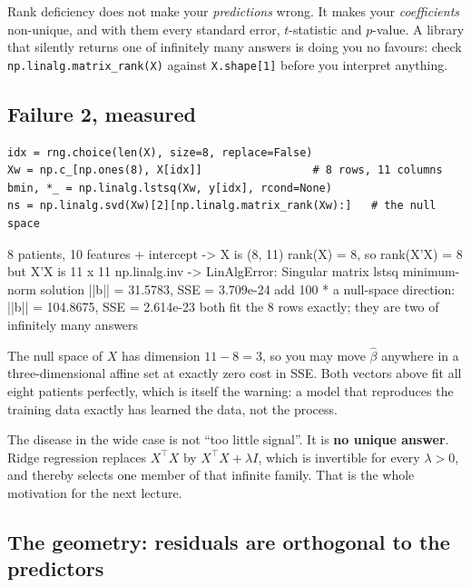 \documentclass[11pt]{article}
\newcommand{\Xt}{X^{\!\top}}
\begin{document}
\begin{caution}
Rank deficiency does not make your \emph{predictions} wrong. It makes your
\emph{coefficients} non-unique, and with them every standard error,
$t$-statistic and $p$-value. A library that silently returns one of infinitely
many answers is doing you no favours: check
\texttt{np.linalg.matrix\_rank(X)} against \texttt{X.shape[1]} before you
interpret anything.
\end{caution}

\subsection{Failure 2, measured}
\label{sec:fail2}

\begin{lstlisting}
idx = rng.choice(len(X), size=8, replace=False)
Xw = np.c_[np.ones(8), X[idx]]                 # 8 rows, 11 columns
bmin, *_ = np.linalg.lstsq(Xw, y[idx], rcond=None)
ns = np.linalg.svd(Xw)[2][np.linalg.matrix_rank(Xw):]   # the null space
\end{lstlisting}
\begin{codeout}
8 patients, 10 features + intercept -> X is (8, 11)
rank(X) = 8, so rank(X'X) = 8 but X'X is 11 x 11
np.linalg.inv  ->  LinAlgError: Singular matrix
lstsq minimum-norm solution ||b|| = 31.5783, SSE = 3.709e-24
add 100 * a null-space direction: ||b|| = 104.8675, SSE = 2.614e-23
both fit the 8 rows exactly; they are two of infinitely many answers
\end{codeout}

The null space of $X$ has dimension $11 - 8 = 3$, so you may move $\hat\beta$
anywhere in a three-dimensional affine set at exactly zero cost in SSE. Both
vectors above fit all eight patients perfectly, which is itself the warning:
a model that reproduces the training data exactly has learned the data, not
the process.

\begin{keyidea}
The disease in the wide case is not ``too little signal''. It is
\textbf{no unique answer}. Ridge regression replaces $\Xt X$ by
$\Xt X + \lambda I$, which is invertible for every $\lambda > 0$, and thereby
selects one member of that infinite family. That is the whole motivation for
the next lecture.
\end{keyidea}

\subsection{The geometry: residuals are orthogonal to the predictors}
\label{sec:geometry}
\end{document}
